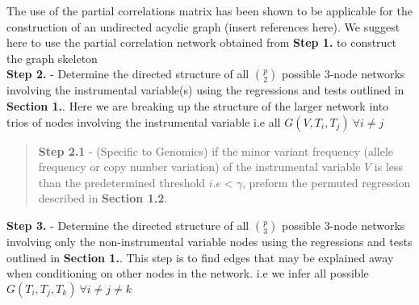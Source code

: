 \documentclass[12pt]{report}
\begin{document}
The use of the partial correlations matrix has been shown to be applicable for the construction of an undirected acyclic graph (insert references here). We suggest here to use the partial correlation network obtained from \textbf{Step 1.} to construct the graph skeleton\\


\noindent \textbf{Step 2.} - Determine the directed structure of all $p\choose 2$ possible 3-node networks involving the instrumental variable(s) using the regressions and tests outlined in \textbf{Section 1.}. Here we are breaking up the structure of the larger network into trios of nodes involving the instrumental variable i.e all $G(V, T_i, T_j) \ \forall i\neq j$\\

\begin{quote}
\textbf{Step 2.1} - (Specific to Genomics) if the minor variant frequency (allele frequency or copy number variation) of the instrumental variable $V$ is less than the predetermined threshold $i.e < \gamma$, preform the permuted regression described in \textbf{Section 1.2}. 
\end{quote}

\noindent \textbf{Step 3.} -  Determine the directed structure of all $p\choose 3$ possible 3-node networks involving only the non-instrumental variable nodes using the regressions and tests outlined in \textbf{Section 1.}. This step is to find edges that may be explained away when conditioning on other nodes in the network. i.e we infer all possible $G(T_i, T_j, T_k) \ \forall i\neq j\neq k$\\












\newpage
\end{document}
